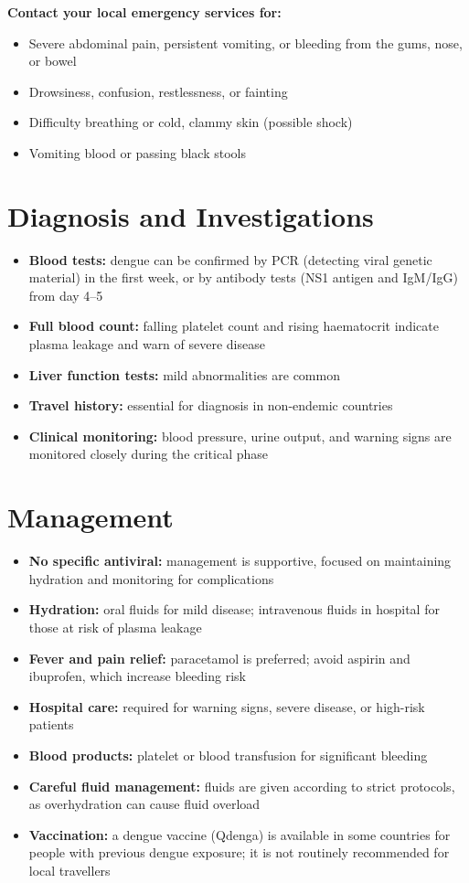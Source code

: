 \textbf{Contact your local emergency services for:}
\begin{itemize}
    \item Severe abdominal pain, persistent vomiting, or bleeding from the gums, nose, or bowel
    \item Drowsiness, confusion, restlessness, or fainting
    \item Difficulty breathing or cold, clammy skin (possible shock)
    \item Vomiting blood or passing black stools
\end{itemize}

\section*{Diagnosis and Investigations}
\begin{itemize}
    \item \textbf{Blood tests:} dengue can be confirmed by PCR (detecting viral genetic material) in the first week, or by antibody tests (NS1 antigen and IgM/IgG) from day 4--5
    \item \textbf{Full blood count:} falling platelet count and rising haematocrit indicate plasma leakage and warn of severe disease
    \item \textbf{Liver function tests:} mild abnormalities are common
    \item \textbf{Travel history:} essential for diagnosis in non-endemic countries
    \item \textbf{Clinical monitoring:} blood pressure, urine output, and warning signs are monitored closely during the critical phase
\end{itemize}

\section*{Management}
\begin{itemize}
    \item \textbf{No specific antiviral:} management is supportive, focused on maintaining hydration and monitoring for complications
    \item \textbf{Hydration:} oral fluids for mild disease; intravenous fluids in hospital for those at risk of plasma leakage
    \item \textbf{Fever and pain relief:} paracetamol is preferred; avoid aspirin and ibuprofen, which increase bleeding risk
    \item \textbf{Hospital care:} required for warning signs, severe disease, or high-risk patients
    \item \textbf{Blood products:} platelet or blood transfusion for significant bleeding
    \item \textbf{Careful fluid management:} fluids are given according to strict protocols, as overhydration can cause fluid overload
    \item \textbf{Vaccination:} a dengue vaccine (Qdenga) is available in some countries for people with previous dengue exposure; it is not routinely recommended for local travellers
\end{itemize}


